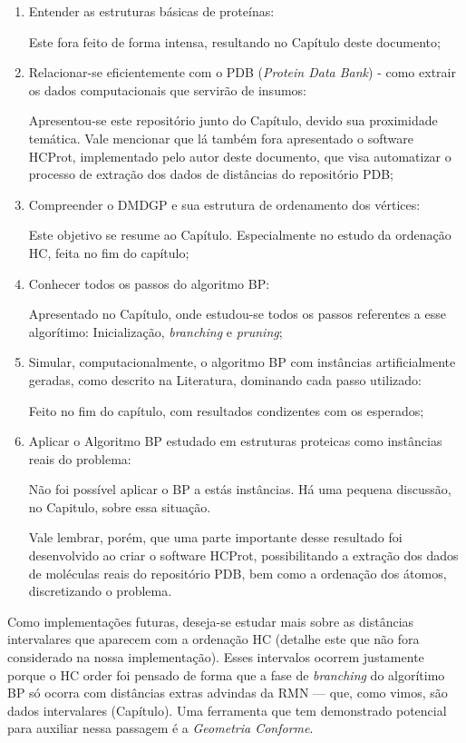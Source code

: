 \documentclass[a4paper,12pt]{article}
\begin{document}
	\begin{enumerate}
		\item Entender as estruturas básicas de proteínas:
		
		Este fora feito de forma intensa, resultando no Capítulo deste documento;
		
		\item Relacionar-se eficientemente com o PDB (\emph{Protein Data Bank}) - como extrair os dados computacionais que servirão de insumos:
		
		Apresentou-se este repositório junto do Capítulo, devido sua proximidade temática. Vale mencionar que lá também fora apresentado o software HCProt, implementado pelo autor deste documento, que visa automatizar o processo de extração dos dados de distâncias do repositório PDB;
		
		\item Compreender o DMDGP e sua estrutura de ordenamento dos vértices:
		
		Este objetivo se resume ao Capítulo. Especialmente no estudo da ordenação HC, feita no fim do capítulo;
		
		\item Conhecer todos os passos do algoritmo BP:
		
		Apresentado no Capítulo, onde estudou-se todos os passos referentes a esse algorítimo: Inicialização, \textit{branching} e \textit{pruning};
		
		\item Simular, computacionalmente, o algoritmo BP com instâncias artificialmente geradas, como descrito na Literatura, dominando cada passo utilizado:
		
		Feito no fim do capítulo, com resultados condizentes com os esperados;
		
		\item Aplicar o Algoritmo BP estudado em estruturas proteicas como instâncias reais do problema:
		
		Não foi possível aplicar o BP a estás instâncias. Há uma pequena discussão, no Capitulo, sobre essa situação.
		
		Vale lembrar, porém, que uma parte importante desse resultado foi desenvolvido ao criar o software HCProt, possibilitando a extração dos dados de moléculas reais do repositório PDB, bem como a ordenação dos átomos, discretizando o problema.
	\end{enumerate}
	
	Como implementações futuras, deseja-se estudar mais sobre as distâncias intervalares que aparecem com a ordenação HC (detalhe este que não fora considerado na nossa implementação). Esses intervalos ocorrem justamente porque o HC order foi pensado de forma que a fase de \textit{branching} do algorítimo BP só ocorra com distâncias extras advindas da RMN --- que, como vimos, são dados intervalares (Capítulo). Uma ferramenta que tem demonstrado potencial para auxiliar nessa passagem é a \textit{Geometria Conforme}.
	
\end{document}
